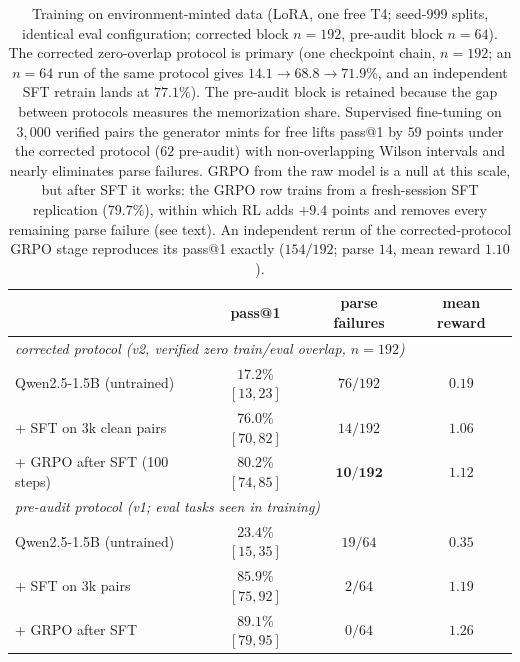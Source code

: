 \documentclass[11pt]{article}
\begin{document}
\begin{table}[t]
\centering\small
\begin{tabular}{lccc}
\toprule
 & pass@1 & parse failures & mean reward \\
\midrule
\multicolumn{4}{l}{\emph{corrected protocol (v2, verified zero train/eval overlap, $n{=}192$)}} \\
Qwen2.5-1.5B (untrained) & $17.2\%$ $[13,23]$ & $76/192$ & $0.19$ \\
+ SFT on 3k clean pairs & $76.0\%$ $[70,82]$ & $14/192$ & $1.06$ \\
+ GRPO after SFT (100 steps) & $\mathbf{80.2\%}$ $[74,85]$ & $\mathbf{10/192}$ & $\mathbf{1.12}$ \\
\midrule
\multicolumn{4}{l}{\emph{pre-audit protocol (v1; eval tasks seen in training)}} \\
Qwen2.5-1.5B (untrained) & $23.4\%$ $[15,35]$ & $19/64$ & $0.35$ \\
+ SFT on 3k pairs & $85.9\%$ $[75,92]$ & $2/64$ & $1.19$ \\
+ GRPO after SFT & $89.1\%$ $[79,95]$ & $0/64$ & $1.26$ \\
\bottomrule
\end{tabular}
\caption{Training on environment-minted data (LoRA, one free T4; seed-999 splits, identical eval configuration; corrected block $n{=}192$, pre-audit block $n{=}64$). The corrected zero-overlap protocol is primary (one checkpoint chain, $n{=}192$; an $n{=}64$ run of the same protocol gives $14.1\to68.8\to71.9\%$, and an independent SFT retrain lands at $77.1\%$). The pre-audit block is retained because the gap between protocols measures the memorization share. Supervised fine-tuning on $3{,}000$ verified pairs the generator mints for free lifts pass@1 by $59$ points under the corrected protocol ($62$ pre-audit) with non-overlapping Wilson intervals and nearly eliminates parse failures. GRPO from the raw model is a null at this scale, but after SFT it works: the GRPO row trains from a fresh-session SFT replication ($79.7\%$), within which RL adds $+9.4$ points and removes every remaining parse failure (see text). An independent rerun of the corrected-protocol GRPO stage reproduces its pass@1 exactly ($154/192$; parse $14$, mean reward $1.10$).}
\label{tab:rl}
\end{table}
\end{document}
